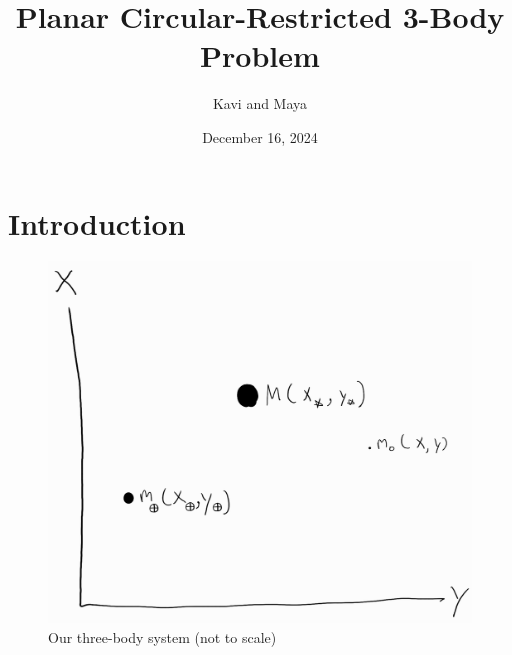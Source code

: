 \documentclass[11pt]{article}
\title{Planar Circular-Restricted 3-Body Problem}
\author{Kavi and Maya}
\date{December 16, 2024}
\begin{document}
\maketitle

\section{Introduction}



\begin{figure}[H]
    \centering
    \includegraphics[width=0.5\linewidth]{figures/3body.png}
    \caption{Our three-body system (not to scale)}
    \label{fig:3body}
\end{figure}
  
\end{document}

